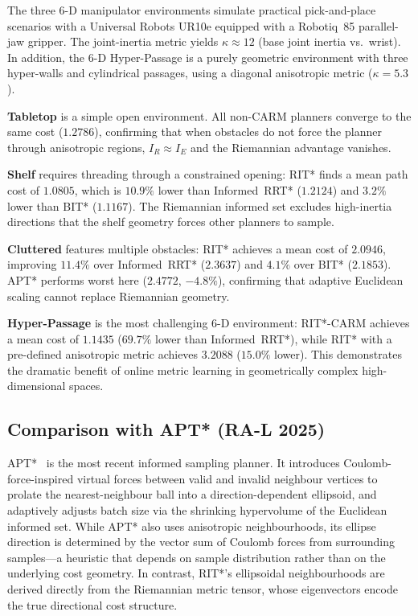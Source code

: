 \documentclass[journal]{IEEEtran}
\newcommand{\IR}{I_{\!R}}
\newcommand{\IE}{I_{\!E}}
\begin{document}
The three 6-D manipulator environments simulate practical
pick-and-place scenarios with a Universal Robots UR10e equipped with a
Robotiq~85 parallel-jaw gripper. The joint-inertia metric yields
$\kappa \approx 12$ (base joint inertia vs.\ wrist). In addition,
the 6-D Hyper-Passage is a purely geometric environment with three
hyper-walls and cylindrical passages, using a diagonal anisotropic
metric ($\kappa = 5.3$).

\textbf{Tabletop} is a simple open environment. All non-CARM planners
converge to the same cost ($1.2786$), confirming that when obstacles
do not force the planner through anisotropic regions,
$\IR \approx \IE$ and the Riemannian advantage vanishes.

\textbf{Shelf} requires threading through a constrained opening:
RIT* finds a mean path cost of $1.0805$, which is $10.9\%$ lower than
Informed~RRT* ($1.2124$) and $3.2\%$ lower than BIT* ($1.1167$).
The Riemannian informed set excludes high-inertia directions that
the shelf geometry forces other planners to sample.

\textbf{Cluttered} features multiple obstacles: RIT* achieves a mean
cost of $2.0946$, improving $11.4\%$ over Informed~RRT* ($2.3637$)
and $4.1\%$ over BIT* ($2.1853$). APT* performs worst here ($2.4772$,
$-4.8\%$), confirming that adaptive Euclidean scaling cannot replace
Riemannian geometry.

\textbf{Hyper-Passage} is the most challenging 6-D environment:
RIT*-CARM achieves a mean cost of $1.1435$ ($69.7\%$ lower than
Informed~RRT*), while RIT* with a pre-defined anisotropic metric
achieves $3.2088$ ($15.0\%$ lower). This demonstrates the dramatic
benefit of online metric learning in geometrically complex
high-dimensional spaces.

\subsection{Comparison with APT* (RA-L 2025)}

APT*~\cite{APT2025} is the most recent informed sampling planner.
It introduces Coulomb-force-inspired virtual forces between valid and
invalid neighbour vertices to prolate the nearest-neighbour ball into
a direction-dependent ellipsoid, and adaptively adjusts batch size via
the shrinking hypervolume of the Euclidean informed set.
While APT* also uses anisotropic neighbourhoods, its ellipse direction
is determined by the vector sum of Coulomb forces from surrounding
samples---a heuristic that depends on sample distribution rather than
on the underlying cost geometry. In contrast, RIT*'s ellipsoidal
neighbourhoods are derived directly from the Riemannian metric tensor,
whose eigenvectors encode the true directional cost structure.
\end{document}
